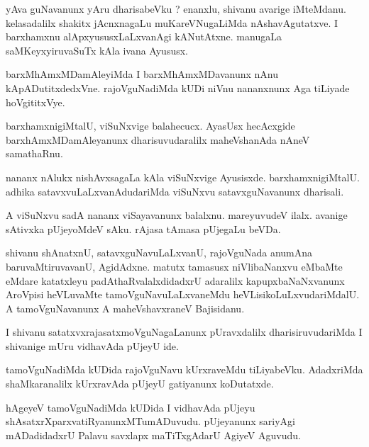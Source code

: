 \documentclass{article}
\begin{document}
\begin{mn}
yAva  guNavanunx  yAru  dharisabeVku ?  enanxlu,  shivanu  avarige  iMteMdanu.  kelasadalilx  shakitx  
jAcnxnagaLu  muKareVNugaLiMda  nAshavAgutatxve.  I  barxhamxnu  alApxyususxLaLxvanAgi  kANutAtxne.  
manugaLa  saMKeyxyiruvaSuTx kAla  ivana  Ayususx.
\end{mn}

\begin{mn}
barxMhAmxMDamAleyiMda  I  barxMhAmxMDavanunx  nAnu  kApADutitxdedxVne.  rajoVguNadiMda  kUDi  niVnu  
nananxnunx  Aga  tiLiyade  hoVgititxVye.
\end{mn}

\begin{mn}
barxhamxnigiMtalU,  viSuNxvige  balahecucx.  AyasUsx  hecAcxgide  barxhAmxMDamAleyanunx  dharisuvudaralilx  
maheVshanAda  nAneV  samathaRnu.
\end{mn}

\begin{mn}
nananx  nAlukx  nishAvxsagaLa  kAla  viSuNxvige  Ayusisxde.  barxhamxnigiMtalU.  adhika  
satavxvuLaLxvanAdudariMda  viSuNxvu  satavxguNavanunx  dharisali.
\end{mn}

\begin{mn}
A  viSuNxvu  sadA  nananx  viSayavanunx  balalxnu.  mareyuvudeV  ilalx.  avanige  sAtivxka pUjeyoMdeV  
sAku.  rAjasa  tAmasa  pUjegaLu  beVDa.
\end{mn}

\begin{mn}
shivanu  shAnatxnU,  satavxguNavuLaLxvanU,  rajoVguNada  anumAna  baruvaMtiruvavanU,  AgidAdxne.  matutx  tamasusx  
niVlibaNanxvu  eMbaMte  eMdare  katatxleyu  padAthaRvalalxdidadxrU  adaralilx  kapupxbaNaNxvanunx  AroVpisi  heVLuvaMte  
tamoVguNavuLaLxvaneMdu  heVLisikoLuLxvudariMdalU.  A  tamoVguNavanunx  A  maheVshavxraneV  Bajisidanu.
\end{mn}

\begin{mn}
I  shivanu  satatxvxrajasatxmoVguNagaLanunx  pUravxdalilx  dharisiruvudariMda  I  shivanige  mUru  vidhavAda  pUjeyU  ide.
\end{mn}

\begin{mn}
tamoVguNadiMda  kUDida  rajoVguNavu  kUrxraveMdu  tiLiyabeVku.  AdadxriMda  shaMkaranalilx  kUrxravAda  pUjeyU  
gatiyanunx  koDutatxde.
\end{mn}

\begin{mn}
hAgeyeV  tamoVguNadiMda  kUDida  I  vidhavAda  pUjeyu  shAsatxrXparxvatiRyanunxMTumADuvudu.  pUjeyanunx  
sariyAgi  mADadidadxrU  Palavu  savxlapx maTiTxgAdarU  AgiyeV  Aguvudu.
\end{mn}
\end{document}
